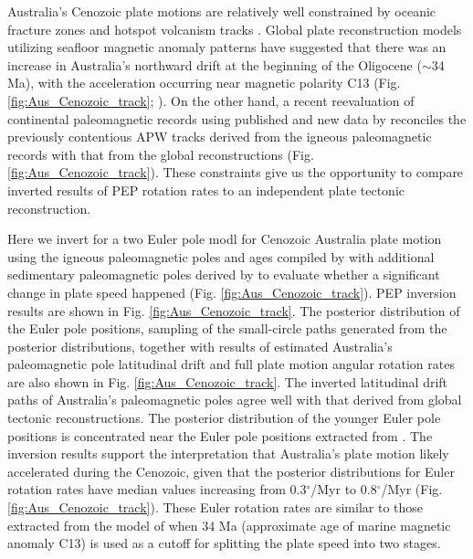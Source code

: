 \documentclass[11pt,letterpaper]{article}
\begin{document}
Australia's Cenozoic plate motions are relatively well constrained by oceanic fracture zones and hotspot volcanism tracks \citep{Muller2016a}. Global plate reconstruction models utilizing seafloor magnetic anomaly patterns have suggested that there was an increase in Australia's northward drift at the beginning of the Oligocene ($\sim$34 Ma), with the acceleration occurring near magnetic polarity C13 (Fig. \ref{fig:Aus_Cenozoic_track}; \cite{Tikku1999a}). On the other hand, a recent reevaluation of continental paleomagnetic records using published and new data by \cite{Hansma2019a} reconciles the previously contentious APW tracks derived from the igneous paleomagnetic records \citep{Idnurm1985a, Idnurm1994a, Musgrave1989a, Opdyke2004a, Hansma2018a} with that from the global reconstructions (Fig. \ref{fig:Aus_Cenozoic_track}). These constraints give us the opportunity to compare inverted results of PEP rotation rates to an independent plate tectonic reconstruction.

Here we invert for a two Euler pole modl for Cenozoic Australia plate motion using the igneous paleomagnetic poles and ages compiled by \cite{Hansma2019a} with additional sedimentary paleomagnetic poles derived by \cite{Idnurm1985a} to evaluate whether a significant change in plate speed happened (Fig. \ref{fig:Aus_Cenozoic_track}). PEP inversion results are shown in Fig. \ref{fig:Aus_Cenozoic_track}. The posterior distribution of the Euler pole positions, sampling of the small-circle paths generated from the posterior distributions, together with results of estimated Australia's paleomagnetic pole latitudinal drift and full plate motion angular rotation rates are also shown in Fig. \ref{fig:Aus_Cenozoic_track}. The inverted latitudinal drift paths of Australia's paleomagnetic poles agree well with that derived from global tectonic reconstructions. The posterior distribution of the younger Euler pole positions is concentrated near the Euler pole positions extracted from \cite{Muller2016a}. The inversion results support the interpretation that Australia's plate motion likely accelerated during the Cenozoic, given that the posterior distributions for Euler rotation rates have median values increasing from 0.3$^\circ$/Myr to 0.8$^\circ$/Myr (Fig. \ref{fig:Aus_Cenozoic_track}). These Euler rotation rates are similar to those extracted from the model of \cite{Muller2016a} when 34 Ma (approximate age of marine magnetic anomaly C13) is used as a cutoff for splitting the plate speed into two stages. 
\end{document}
